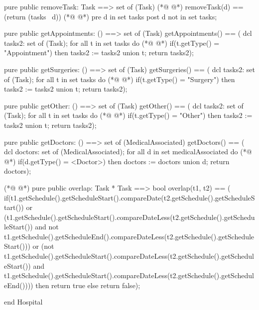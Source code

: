 \begin{vdmpp}[breaklines=true]
 pure public removeTask: Task ==> set of (Task)
(*@
\label{getAppointments:62}
@*)
  removeTask(d) == (return (tasks \ {d}))
(*@
\label{getTasksByType:63}
@*)
 pre d in set tasks
 post d not in set tasks;
 
 pure public getAppointments: () ==> set of (Task)
  getAppointments() == (
              dcl tasks2: set of (Task);
              for all t in set tasks do
(*@
\label{getSurgeries:70}
@*)
               if(t.getType() = "Appointment")
                then tasks2 := tasks2 union {t};
              return tasks2);
              
 pure public getSurgeries: () ==> set of (Task)
  getSurgeries() == (
              dcl tasks2: set of (Task);
              for all t in set tasks do
(*@
\label{getOther:78}
@*)
               if(t.getType() = "Surgery")
                then tasks2 := tasks2 union {t};
              return tasks2);
              
 pure public getOther: () ==> set of (Task)
  getOther() == (
              dcl tasks2: set of (Task);
              for all t in set tasks do
(*@
\label{getDoctors:86}
@*)
               if(t.getType() = "Other")
                then tasks2 := tasks2 union {t};
              return tasks2);

 pure public getDoctors: () ==> set of (MedicalAssociated)
  getDoctors() == (
           dcl doctors: set of (MedicalAssociated);
           for all d in set medicalAssociated do
(*@
\label{geNormalDoctors:94}
@*)
            if(d.getType() = <Doctor>)
             then doctors := doctors union {d};
           return doctors);
           
(*@
\label{overlap:98}
@*)
 pure public overlap: Task * Task ==> bool
  overlap(t1, t2) == (
             if(t1.getSchedule().getScheduleStart().compareDate(t2.getSchedule().getScheduleStart()) 
              or (t1.getSchedule().getScheduleStart().compareDateLess(t2.getSchedule().getScheduleStart()) 
              and not t1.getSchedule().getScheduleEnd().compareDateLess(t2.getSchedule().getScheduleStart()))
              or (not t1.getSchedule().getScheduleStart().compareDateLess(t2.getSchedule().getScheduleStart()) 
              and t1.getSchedule().getScheduleStart().compareDateLess(t2.getSchedule().getScheduleEnd())))
              then return true
             else
              return false);
              
end Hospital
\end{vdmpp}
